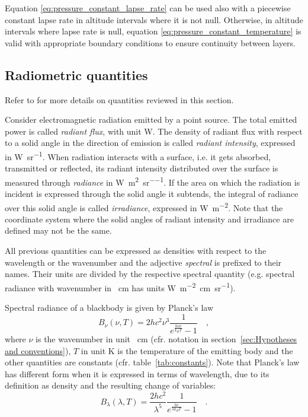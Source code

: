\documentclass[a4paper,10pt,final,twocolumn]{article}
\begin{document}
Equation \eqref{eq:pressure_constant_lapse_rate} can be used also with a piecewise constant lapse rate in altitude intervals where it is not null. Otherwise, in altitude intervals where lapse rate is null, equation \eqref{eq:pressure_constant_temperature} is valid with appropriate boundary conditions to ensure continuity between layers.

\subsection{Radiometric quantities}
\label{sec:Radiometric quantities}
Refer to \cite{CIE} for more details on quantities reviewed in this section.

Consider electromagnetic radiation emitted by a point source. The total emitted power is called \emph{radiant flux}, with unit \unit{\watt}. The density of radiant flux with respect to a solid angle in the direction of emission is called \emph{radiant intensity}, expressed in \unit{\watt\per\steradian}. When radiation interacts with a surface, i.e. it gets absorbed, transmitted or reflected, its radiant intensity distributed over the surface is measured through \emph{radiance} in \unit{\watt\per\square\metre\per\steradian}. If the area on which the radiation is incident is expressed through the solid angle it subtends, the integral of radiance over this solid angle is called \emph{irradiance}, expressed in \unit{\watt\per\square\metre}. Note that the coordinate system where the solid angles of radiant intensity and irradiance are defined may not be the same.


All previous quantities can be expressed as densities with respect to the wavelength or the wavenumber and the adjective \emph{spectral} is prefixed to their names. Their units are divided by the respective spectral quantity (e.g. spectral radiance with wavenumber in \unit{\per\centi\metre} has units \unit{\watt\per\metre\squared\centi\metre\per\steradian}).

Spectral radiance of a blackbody is given by Planck's law
\begin{equation}
  \label{eq:blackbody_spectral_radiance}
  B_\nu (\nu, T) = 2 h c^2 \nu^3 \frac{1}{e^\frac{h c \nu}{k_B T} - 1}
  \quad ,
\end{equation}
where $\nu$ is the wavenumber in unit \unit{\per\centi\metre} (cfr. notation in section~\ref{sec:Hypotheses and conventions}), $T$ in unit \unit{\kelvin} is the temperature of the emitting body and the other quantities are constants (cfr. table~\ref{tab:constants}).
Note that Planck's law has different form when it is expressed in terms of wavelength, due to its definition as density and the resulting change of variables:
\begin{equation}
  \label{eq:blackbody_spectral_radiance_lambda}
  B_\lambda (\lambda, T) = \frac{2 h c^2}{\lambda^5} \frac{1}{e^\frac{h c}{\lambda k_B T} - 1}
  \quad .
\end{equation}
\end{document}
